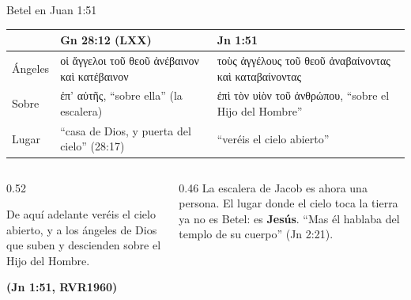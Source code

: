 \documentclass[hyperref={bookmarks=false},aspectratio=169]{beamer}
\newcommand{\grc}[1]{\foreignlanguage{ancientgreek}{#1}}
\newcommand{\fuente}[1]{\par\hfill{\upshape\bfseries\footnotesize\textcolor{azul}{#1}}}
\newcommand{\destacar}[1]{\textbf{\textcolor{azul}{#1}}}
\begin{document}
\begin{frame}{Betel en Juan 1:51}
\scriptsize\renewcommand{\arraystretch}{1.18}
\begin{tabular}{@{}>{\RaggedRight\arraybackslash}p{1.6cm}>{\RaggedRight\arraybackslash}p{5.0cm}>{\RaggedRight\arraybackslash}p{5.2cm}@{}}
\toprule
 & \textbf{Gn 28:12 (LXX)} & \textbf{Jn 1:51} \\ \midrule
Ángeles & \grc{οἱ ἄγγελοι τοῦ θεοῦ ἀνέβαινον καὶ κατέβαινον} & \grc{τοὺς ἀγγέλους τοῦ θεοῦ ἀναβαίνοντας καὶ καταβαίνοντας} \\
Sobre & \grc{ἐπ’ αὐτῆς}, ``sobre ella'' (la escalera) & \grc{ἐπὶ τὸν υἱὸν τοῦ ἀνθρώπου}, ``sobre el Hijo del Hombre'' \\
Lugar & ``casa de Dios, y puerta del cielo'' (28:17) & ``veréis el cielo abierto'' \\
\bottomrule
\end{tabular}\par\medskip
\begin{columns}[t,onlytextwidth]
\begin{column}{0.52\textwidth}
\begin{cita}[fontupper=\scriptsize\itshape]De aquí adelante veréis el cielo abierto, y a los ángeles de Dios que suben y descienden sobre el Hijo del Hombre.\fuente{(Jn 1:51, RVR1960)}\end{cita}
\end{column}
\begin{column}{0.46\textwidth}\small
La escalera de Jacob es ahora una persona. El lugar donde el cielo toca la tierra ya no es Betel: es \destacar{Jesús}. ``Mas él hablaba del templo de su cuerpo'' (Jn 2:21).
\end{column}
\end{columns}
\end{frame}
\end{document}
